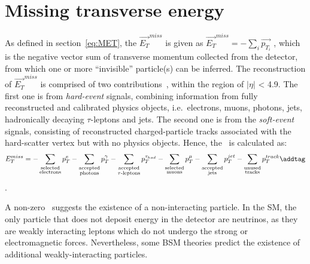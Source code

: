 \section{Missing transverse energy}
As defined in section~\ref{eq:MET}, the $\vec{E_T}^{miss}$ is given 
as
$\vec{E_T}^{miss}=-\sum_i \vec{p_{T_i}}$
,
which is the negative vector sum of transverse momentum collected from the 
detector, from which one or more ``invisible'' particle(s) can be inferred.
The reconstruction of $\vec{E_T}^{miss}$ is comprised of two contributions~\cite{MET2018},
within the region of $|\eta|$ < 4.9. 
The first one is from \textit{hard-event} signals, combining 
information from fully reconstructed and calibrated 
physics objects, i.e.\ electrons, muons, photons, jets,
hadronically decaying $\tau$-leptons and jets. 
The second one is from the \textit{soft-event} signals, consisting of 
reconstructed charged-particle tracks associated with the hard-scatter
vertex but with no physics objects.
Hence, the \MET\ is calculated as:
\[ E^{miss}_T = - \sum_{\substack{\text{selected}\\ \text{electrons}}} p^e_T 
- \sum_{\substack{\text{accepted} \\  \text{photons}}} p^{\gamma}_T   
- \sum_{\substack{\text{accepted} \\  \text{$\tau$-leptons}}} p^{\tau_{had}}_T 
- \sum_{\substack{\text{selected} \\  \text{muons}}} p^{\mu}_T 
- \sum_{\substack{\text{accepted} \\  \text{jets}}} p^{jet}_T 
- \sum_{\substack{\text{unused}\\ \text{tracks}}} p^{track}_T
\addtag \].


A non-zero \MET\ suggests
the existence of a non-interacting particle.
In the SM, the only particle that does
not deposit energy in the detector are neutrinos, 
as they are weakly interacting leptons
which do not undergo the strong or electromagnetic forces.
Nevertheless, some BSM theories predict
the existence of additional weakly-interacting particles.

